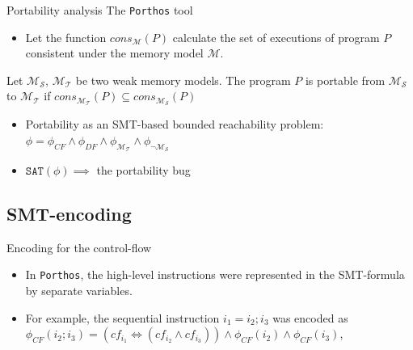 \documentclass{beamer}
\begin{document}
\begin{frame}{Portability analysis} {The \texttt{Porthos} tool}

\begin{itemize}
\item Let the function $\textit{cons}_{\mathcal{M}}(P)$ calculate the set of executions of program $P$ consistent under the memory model $\mathcal{M}$.
\end{itemize}

\begin{definition}
Let $\mathcal{M_S}$, $\mathcal{M_T}$ be two weak memory models.
The program $P$ is portable from $\mathcal{M_S}$ to $\mathcal{M_T}$ if 
$\textit{cons}_{\mathcal{M_T}}(P) \subseteq \textit{cons}_{\mathcal{M_S}}(P)$
\end{definition}

\begin{itemize}
\item Portability as an SMT-based bounded reachability problem: \\
${\phi = \phi_{CF} \land \phi_{DF} \land \phi_{\mathcal{M_T}} \land \phi_{\lnot\mathcal{M_S}}}$
\item $\texttt{SAT}(\phi) \implies $ the portability bug
\end{itemize}

\end{frame}



\subsection{SMT-encoding}


\begin{frame}{Encoding for the control-flow}%
\begin{itemize}
\item In \texttt{Porthos}, the high-level instructions were represented in the SMT-formula by separate variables.
\item For example, the sequential instruction $i_1 = i_2; i_3$ was encoded as
$\phi_{CF}(i_2;i_3) = (cf_{i_1} \Leftrightarrow (cf_{i_2} \land cf_{i_3})) \land \phi_{CF}(i_2) \land \phi_{CF}(i_3)$,
\end{itemize}
\end{frame}
\end{document}
